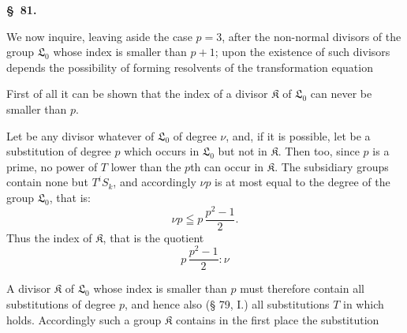 \begin{center}
\textbf{\S\ 81. }
\end{center}

We now inquire, leaving aside the case $p = 3$, after the non-normal divisors of the group $\mathfrak{L}_0$ whose index is smaller than $p+1$; upon the existence of such divisors depends the possibility of forming resolvents of the transformation equation 

First of all it can be shown that the index of a divisor $\mathfrak{K}$ of $\mathfrak{L}_0$ can never be smaller than $p$.

Let
be any divisor whatever of $\mathfrak{L}_0$ of degree $\nu$, and, if it is possible, let
be a substitution of degree $p$ which occurs in $\mathfrak{L}_0$ but not in $\mathfrak{K}$. Then too, since $p$ is a prime, no power of $T$ lower than the $p$th can occur in $\mathfrak{K}$. The subsidiary groups
contain none but  $T^i S_k$, and accordingly $\nu p$ is at most equal to the degree of the group $\mathfrak{L}_0$, that is:
\[
\nu p \leqq p\,\frac{p^2-1}{2}.
\]
Thus the index of $\mathfrak{K}$, that is the quotient
\[
p\,\frac{p^2-1}{2} : \nu
\]

A divisor $\mathfrak{K}$ of $\mathfrak{L}_0$ whose index is smaller than $p$ must therefore contain all substitutions of degree $p$, and hence also (§ 79, I.) all substitutions $T$ in which
holds. Accordingly such a group $\mathfrak{K}$ contains in the first place the substitution
